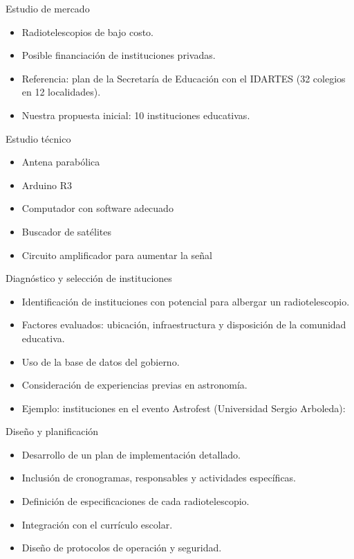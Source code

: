 \begin{frame}{Estudio de mercado}
	\begin{itemize}
    \item Radiotelescopios de bajo costo.
    \item Posible financiación de instituciones privadas.
    \item Referencia: plan de la Secretaría de Educación con el IDARTES 
		(32 colegios en 12 localidades).
    \item Nuestra propuesta inicial: 10 instituciones educativas.
	\end{itemize}
\end{frame}

\begin{frame}{Estudio técnico}
	\begin{itemize}
    \item Antena parabólica
    \item Arduino R3
    \item Computador con software adecuado
    \item Buscador de satélites
    \item Circuito amplificador para aumentar la señal
	\end{itemize}
\end{frame}

\begin{frame}{Diagnóstico y selección de instituciones}
	\begin{itemize}
    \item Identificación de instituciones con potencial para albergar un 
		radiotelescopio.
    \item Factores evaluados: ubicación, infraestructura y disposición de la 
		comunidad educativa.
    \item Uso de la base de datos del gobierno.
    \item Consideración de experiencias previas en astronomía.
    \item Ejemplo: instituciones en el evento Astrofest (Universidad Sergio 
		Arboleda):
	\end{itemize}
\end{frame}

\begin{frame}{Diseño y planificación}
	\begin{itemize}
    \item Desarrollo de un plan de implementación detallado.
    \item Inclusión de cronogramas, responsables y actividades específicas.
    \item Definición de especificaciones de cada radiotelescopio.
    \item Integración con el currículo escolar.
    \item Diseño de protocolos de operación y seguridad.
	\end{itemize}
\end{frame}

